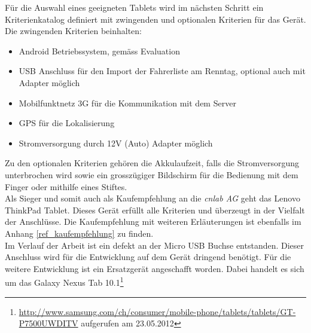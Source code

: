 Für die Auswahl eines geeigneten Tablets wird im nächsten Schritt ein Kriterienkatalog definiert mit zwingenden und optionalen Kriterien für das Gerät. Die zwingenden Kriterien beinhalten:
\begin{itemize}
\item Android Betriebssystem, gemäss Evaluation
\item USB Anschluss für den Import der Fahrerliste am Renntag, optional auch mit Adapter möglich
\item Mobilfunktnetz 3G für die Kommunikation mit dem Server
\item GPS für die Lokalisierung
\item Stromversorgung durch 12V (Auto) Adapter möglich
\end{itemize}
Zu den optionalen Kriterien gehören die Akkulaufzeit, falls die Stromversorgung unterbrochen wird sowie ein grosszügiger Bildschirm für die Bedienung mit dem Finger oder mithilfe eines Stiftes.
\\

Als Sieger und somit auch als Kaufempfehlung an die \textit{cnlab AG} geht das Lenovo ThinkPad Tablet. Dieses Gerät erfüllt alle Kriterien und überzeugt in der Vielfalt der Anschlüsse. Die Kaufempfehlung mit weiteren Erläuterungen ist ebenfalls im Anhang \ref{ref_kaufempfehlung} zu finden.
\\

Im Verlauf der Arbeit ist ein defekt an der Micro USB Buchse entstanden. Dieser Anschluss wird für die Entwicklung auf dem Gerät dringend benötigt. Für die weitere Entwicklung ist ein Ersatzgerät angeschafft worden. Dabei handelt es sich um das Galaxy Nexus Tab 10.1\footnote{\url{http://www.samsung.com/ch/consumer/mobile-phone/tablets/tablets/GT-P7500UWDITV} aufgerufen am 23.05.2012}
